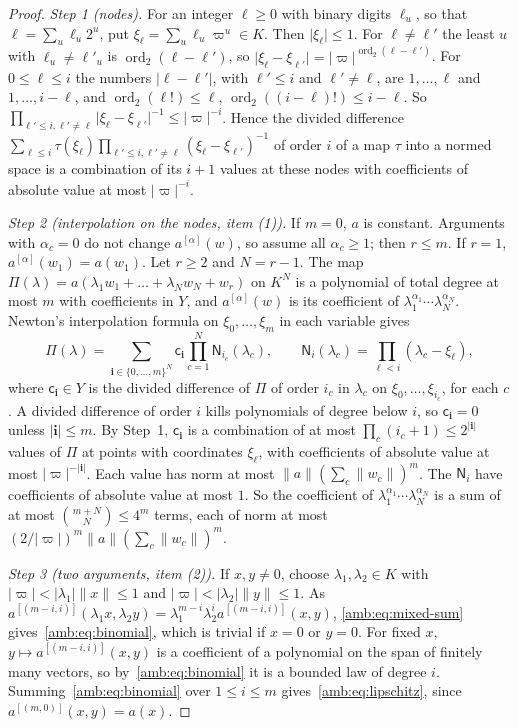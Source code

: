 \documentclass[11pt]{amsart}
\theoremstyle{definition}
\theoremstyle{remark}
\numberwithin{equation}{section}
\newcommand{\abs}[1]{\lvert #1\rvert}
\newcommand{\norm}[1]{\lVert #1\rVert}
\newcommand{\ord}{\operatorname{ord}}
\theoremstyle{plain}
\theoremstyle{definition}
\theoremstyle{plain}
\begin{document}
\begin{proof}
\emph{Step 1 (nodes).} For an integer $\ell\ge0$ with binary digits $\ell_u$, so that $\ell=\sum_u\ell_u2^u$, put $\xi_\ell=\sum_u\ell_u\varpi^u\in K$. Then $\abs{\xi_\ell}\le1$. For $\ell\ne\ell'$ the least $u$ with $\ell_u\ne\ell'_u$ is $\ord_2(\ell-\ell')$, so $\abs{\xi_\ell-\xi_{\ell'}}=\abs\varpi^{\ord_2(\ell-\ell')}$. For $0\le\ell\le i$ the numbers $\abs{\ell-\ell'}$, with $\ell'\le i$ and $\ell'\ne\ell$, are $1,\dots,\ell$ and $1,\dots,i-\ell$, and $\ord_2(\ell!)\le\ell$, $\ord_2((i-\ell)!)\le i-\ell$. So $\prod_{\ell'\le i,\ell'\ne\ell}\abs{\xi_\ell-\xi_{\ell'}}^{-1}\le\abs\varpi^{-i}$. Hence the divided difference $\sum_{\ell\le i}\tau(\xi_\ell)\prod_{\ell'\le i,\ell'\ne\ell}(\xi_\ell-\xi_{\ell'})^{-1}$ of order $i$ of a map $\tau$ into a normed space is a combination of its $i+1$ values at these nodes with coefficients of absolute value at most $\abs\varpi^{-i}$.

\emph{Step 2 (interpolation on the nodes, item (1)).} If $m=0$, $a$ is constant. Arguments with $\alpha_c=0$ do not change $a^{[\alpha]}(w)$, so assume all $\alpha_c\ge1$; then $r\le m$. If $r=1$, $a^{[\alpha]}(w_1)=a(w_1)$. Let $r\ge2$ and $N=r-1$. The map $\Pi(\lambda)=a(\lambda_1w_1+\dots+\lambda_Nw_N+w_r)$ on $K^N$ is a polynomial of total degree at most $m$ with coefficients in $Y$, and $a^{[\alpha]}(w)$ is its coefficient of $\lambda_1^{\alpha_1}\cdots\lambda_N^{\alpha_N}$. Newton's interpolation formula on $\xi_0,\dots,\xi_m$ in each variable gives
\[
 \Pi(\lambda)=\sum_{\mathbf i\in\{0,\dots,m\}^N}\mathsf c_{\mathbf i}\prod_{c=1}^N\mathsf N_{i_c}(\lambda_c),\qquad\mathsf N_i(\lambda_c)=\prod_{\ell<i}(\lambda_c-\xi_\ell),
\]
where $\mathsf c_{\mathbf i}\in Y$ is the divided difference of $\Pi$ of order $i_c$ in $\lambda_c$ on $\xi_0,\dots,\xi_{i_c}$, for each $c$. A divided difference of order $i$ kills polynomials of degree below $i$, so $\mathsf c_{\mathbf i}=0$ unless $\abs{\mathbf i}\le m$. By Step~1, $\mathsf c_{\mathbf i}$ is a combination of at most $\prod_c(i_c+1)\le2^{\abs{\mathbf i}}$ values of $\Pi$ at points with coordinates $\xi_\ell$, with coefficients of absolute value at most $\abs\varpi^{-\abs{\mathbf i}}$. Each value has norm at most $\norm a(\sum_c\norm{w_c})^m$. The $\mathsf N_i$ have coefficients of absolute value at most $1$. So the coefficient of $\lambda_1^{\alpha_1}\cdots\lambda_N^{\alpha_N}$ is a sum of at most $\binom{m+N}N\le4^m$ terms, each of norm at most $(2/\abs\varpi)^m\norm a(\sum_c\norm{w_c})^m$.

\emph{Step 3 (two arguments, item (2)).} If $x,y\ne0$, choose $\lambda_1,\lambda_2\in K$ with $\abs\varpi<\abs{\lambda_1}\norm x\le1$ and $\abs\varpi<\abs{\lambda_2}\norm y\le1$. As $a^{[(m-i,i)]}(\lambda_1x,\lambda_2y)=\lambda_1^{m-i}\lambda_2^ia^{[(m-i,i)]}(x,y)$, \eqref{amb:eq:mixed-sum} gives~\eqref{amb:eq:binomial}, which is trivial if $x=0$ or $y=0$. For fixed $x$, $y\mapsto a^{[(m-i,i)]}(x,y)$ is a coefficient of a polynomial on the span of finitely many vectors, so by~\eqref{amb:eq:binomial} it is a bounded law of degree $i$. Summing~\eqref{amb:eq:binomial} over $1\le i\le m$ gives~\eqref{amb:eq:lipschitz}, since $a^{[(m,0)]}(x,y)=a(x)$.


\end{proof}
\end{document}
